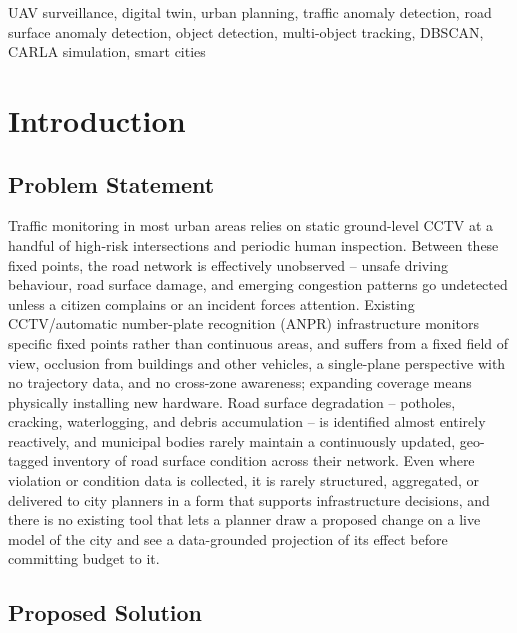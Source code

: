 \documentclass[conference]{IEEEtran}
\begin{document}
\begin{IEEEkeywords}
UAV surveillance, digital twin, urban planning, traffic anomaly detection, road surface anomaly detection, object detection, multi-object tracking, DBSCAN, CARLA simulation, smart cities
\end{IEEEkeywords}

\section{Introduction}

\subsection{Problem Statement}

Traffic monitoring in most urban areas relies on static ground-level CCTV at a handful of high-risk intersections and periodic human inspection. Between these fixed points, the road network is effectively unobserved -- unsafe driving behaviour, road surface damage, and emerging congestion patterns go undetected unless a citizen complains or an incident forces attention. Existing CCTV/automatic number-plate recognition (ANPR) infrastructure monitors specific fixed points rather than continuous areas, and suffers from a fixed field of view, occlusion from buildings and other vehicles, a single-plane perspective with no trajectory data, and no cross-zone awareness; expanding coverage means physically installing new hardware. Road surface degradation -- potholes, cracking, waterlogging, and debris accumulation -- is identified almost entirely reactively, and municipal bodies rarely maintain a continuously updated, geo-tagged inventory of road surface condition across their network. Even where violation or condition data is collected, it is rarely structured, aggregated, or delivered to city planners in a form that supports infrastructure decisions, and there is no existing tool that lets a planner draw a proposed change on a live model of the city and see a data-grounded projection of its effect before committing budget to it.

\subsection{Proposed Solution}
\end{document}
